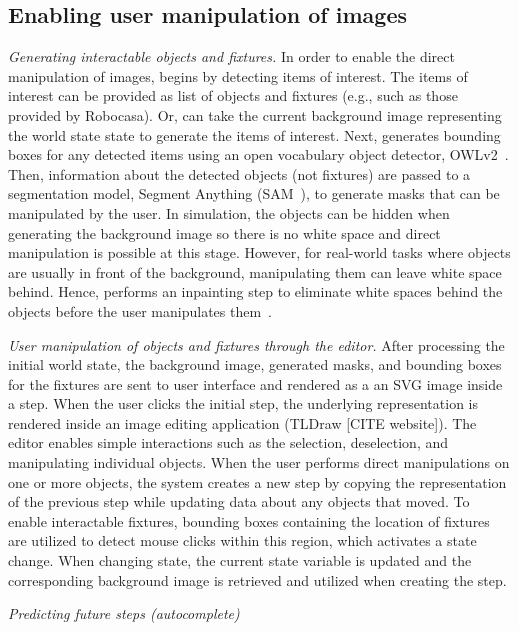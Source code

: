 \subsection{Enabling user manipulation of images}
\emph{Generating interactable objects and fixtures.} In order to enable the direct manipulation of images, \projname begins by detecting items of interest. The items of interest can be provided as list of objects and fixtures (e.g., such as those provided by Robocasa). Or, \projname can take the current background image representing the world state state to generate the items of interest. Next, \projname generates bounding boxes for any detected items using an open vocabulary object detector, OWLv2~\cite{minderer2024scaling}. Then, information about the detected objects (not fixtures) are passed to a segmentation model, Segment Anything (SAM~\cite{kirillov2023segment}), to generate masks that can be manipulated by the user. In simulation, the objects can be hidden when generating the background image so there is no white space and direct manipulation is possible at this stage. However, for real-world tasks where objects are usually in front of the background, manipulating them can leave white space behind. Hence, \projname performs an inpainting step to eliminate white spaces behind the objects before the user manipulates them~\cite{suvorov2022resolution}. 

\emph{User manipulation of objects and fixtures through the editor.} After processing the initial world state, the background image, generated masks, and bounding boxes for the fixtures are sent to user interface and rendered as a an SVG image inside a step. When the user clicks the initial step, the underlying representation is rendered inside an image editing application (TLDraw [CITE website]). The editor enables simple interactions such as the selection, deselection, and manipulating individual objects. When the user performs direct manipulations on one or more objects, the system creates a new step by copying the representation of the previous step while updating data about any objects that moved. To enable interactable fixtures, bounding boxes containing the location of fixtures are utilized to detect mouse clicks within this region, which activates a state change. When changing state, the current state variable is updated and the corresponding background image is retrieved and utilized when creating the step.

\emph{Predicting future steps (autocomplete)}



